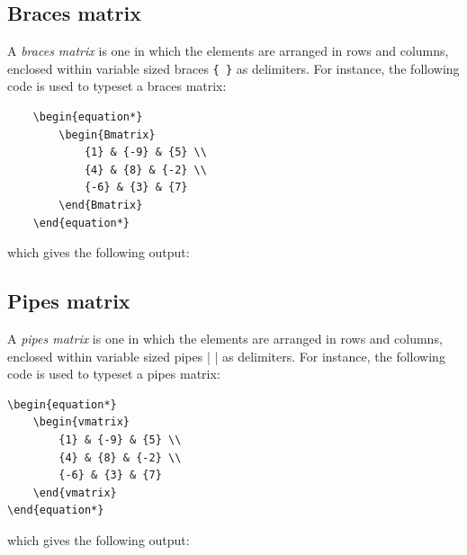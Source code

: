 	\subsection{Braces matrix}
		A \emph{braces matrix} is one in which the elements are arranged in rows and columns, enclosed within variable sized braces \lstinline|{ }| as delimiters. For instance, the following code is used to typeset a braces matrix:
\begin{lstlisting}
	\begin{equation*}
		\begin{Bmatrix}
			{1} & {-9} & {5} \\
			{4} & {8} & {-2} \\
			{-6} & {3} & {7}
		\end{Bmatrix}
	\end{equation*}
\end{lstlisting}
		which gives the following output:
		
	\subsection{Pipes matrix}
		A \emph{pipes matrix} is one in which the elements are arranged in rows and columns, enclosed within variable sized pipes | | as delimiters. For instance, the following code is used to typeset a pipes matrix:
\begin{lstlisting}
\begin{equation*}
	\begin{vmatrix}
		{1} & {-9} & {5} \\
		{4} & {8} & {-2} \\
		{-6} & {3} & {7}
	\end{vmatrix}
\end{equation*}
\end{lstlisting}
		which gives the following output:
		
